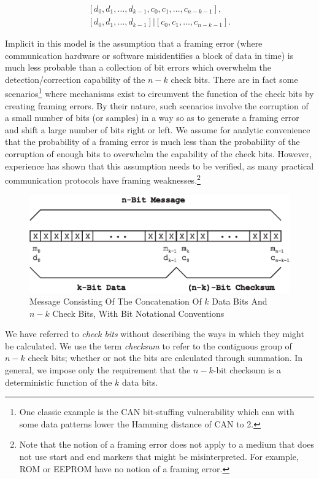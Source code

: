 \begin{eqnarray}
\label{eq:cedc0:scon0:sccb0:02}
& [d_0, d_1, \ldots{}, d_{k-1}, c_0, c_1, \ldots{}, c_{n-k-1}] , & \\
\label{eq:cedc0:scon0:sccb0:02b}
& [d_0, d_1, \ldots{}, d_{k-1}] | [c_0, c_1, \ldots{}, c_{n-k-1}] . &
\end{eqnarray}

Implicit in
this model is the assumption that a framing error (where communication hardware or 
software misidentifies a block of data in time) is much less probable than
a collection of bit errors which overwhelm the detection/correction 
capability of the $n-k$ check bits.  There are in fact some 
scenarios\footnote{One classic example is the CAN bit-stuffing vulnerability which can
with some data patterns lower the Hamming distance of CAN to 2.}
where mechanisms exist to circumvent the function of the check bits by creating 
framing errors.
By their nature, such scenarios involve the corruption of a small number of bits 
(or samples) in a way so as to generate a framing error and shift a large number of bits
right or left.  We assume for analytic convenience that the probability of 
a framing error is much less than the probability of the corruption of enough bits 
to overwhelm the capability of the check bits.  However, experience has shown that 
this assumption needs to be verified, as many practical communication protocols have
framing weaknesses.\footnote{Note that the notion of a framing error does not apply 
to a medium that does not use start and end markers that might be misinterpreted.
For example, ROM or EEPROM have no notion of a framing error.}

\begin{figure}
\centering
\includegraphics[width=4.6in]{c_edc0/cword01.eps}
\caption{Message Consisting Of The Concatenation Of $k$ Data Bits And $n-k$
         Check Bits, With Bit Notational Conventions}
\label{fig:cedc0:scon0:sccb0:01}
\end{figure}

We have referred to \emph{check bits} without describing the ways in which they
might be calculated.  We use the term \emph{checksum} to refer
to the contiguous group of $n-k$ check bits; whether or not the bits are calculated
through summation.  In general, we impose only the requirement that the $n-k$-bit 
checksum is a deterministic function of the $k$ data bits.

